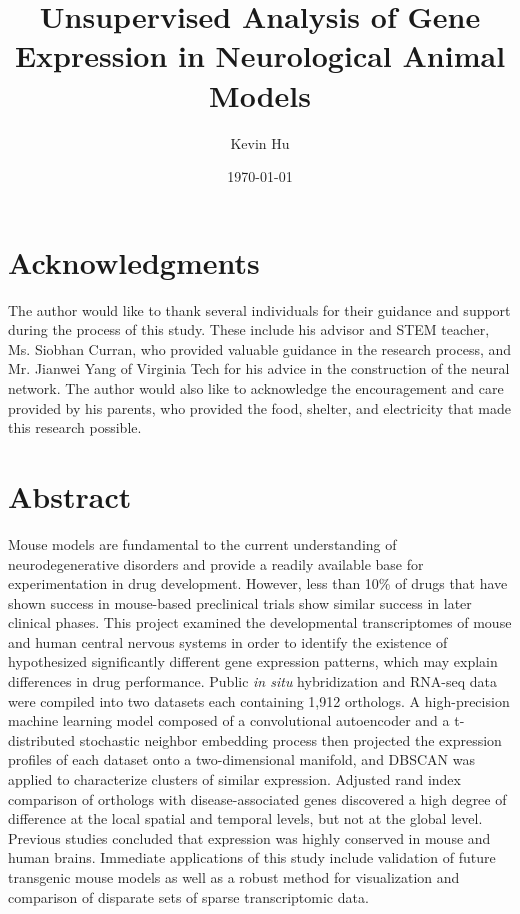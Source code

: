 \documentclass[12pt,oneside,onecolumn,a4paper]{article}
\title{\vspace{6cm}Unsupervised Analysis of Gene Expression in Neurological Animal Models}
\author{Kevin Hu}
\affil{Massachusetts Academy of Math and Science at WPI\vspace{-0.4cm}}
\date{\today}
\begin{document}
\maketitle
\thispagestyle{empty}

\clearpage

\break
\tableofcontents
\break

\section*{Acknowledgments}

The author would like to thank several individuals for their guidance and support during the process of this study. These include his advisor and STEM teacher, Ms. Siobhan Curran, who provided valuable guidance in the research process, and Mr. Jianwei Yang of Virginia Tech for his advice in the construction of the neural network. The author would also like to acknowledge the encouragement and care provided by his parents, who provided the food, shelter, and electricity that made this research possible.

\break

\section{Abstract}

Mouse models are fundamental to the current understanding of neurodegenerative disorders and provide a readily available base for experimentation in drug development. However, less than 10\% of drugs that have shown success in mouse-based preclinical trials show similar success in later clinical phases. This project examined the developmental transcriptomes of mouse and human central nervous systems in order to identify the existence of hypothesized significantly different gene expression patterns, which may explain differences in drug performance. Public \textit{in situ} hybridization and RNA-seq data were compiled into two datasets each containing 1,912 orthologs. A high-precision machine learning model composed of a convolutional autoencoder and a t-distributed stochastic neighbor embedding process then projected the expression profiles of each dataset onto a two-dimensional manifold, and DBSCAN was applied to characterize clusters of similar expression. Adjusted rand index comparison of orthologs with disease-associated genes discovered a high degree of difference at the local spatial and temporal levels, but not at the global level. Previous studies concluded that expression was highly conserved in mouse and human brains. Immediate applications of this study include validation of future transgenic mouse models as well as a robust method for visualization and comparison of disparate sets of sparse transcriptomic data.
\end{document}
